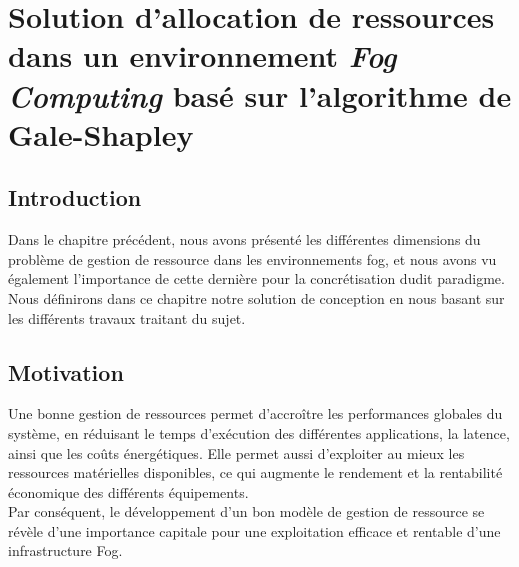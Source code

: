 \chapter{Solution d'allocation de ressources dans un environnement \emph{Fog Computing} basé sur l'algorithme de Gale-Shapley}

\section{Introduction}
Dans le chapitre précédent, nous avons présenté les différentes dimensions du problème de gestion de ressource dans les environnements fog, et nous avons vu également l'importance de cette dernière pour la concrétisation dudit paradigme.
Nous définirons dans ce chapitre notre solution de conception en nous basant sur les différents travaux traitant du sujet.

\section{Motivation}
Une bonne gestion de ressources permet d'accroître les performances globales du système, en réduisant le temps d'exécution des différentes applications, la latence, ainsi que les coûts énergétiques. Elle permet aussi d'exploiter au mieux les ressources matérielles disponibles, ce qui augmente le rendement et la rentabilité économique des différents équipements.\\ 
Par conséquent, le développement d'un bon modèle de gestion de ressource se révèle d'une importance capitale pour une exploitation efficace et rentable d'une infrastructure Fog.

